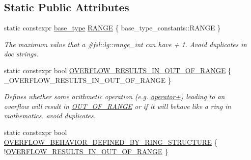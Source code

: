 \subsection*{Static Public Attributes}
\begin{DoxyCompactItemize}
\item 
static constexpr \mbox{\hyperlink{classfsl_1_1ver1__0_1_1lg_1_1range__int_af14c814b65a761cd387e7577eb2ef78c}{base\+\_\+type}} \mbox{\hyperlink{classfsl_1_1ver1__0_1_1lg_1_1range__int_a48e6f92039600251a43bd027a8a5aa10}{R\+A\+N\+GE}} \{ base\+\_\+type\+\_\+constants\+::\+R\+A\+N\+GE \}
\begin{DoxyCompactList}\small\item\em The maximum value that a \#fsl\+::lg\+::range\+\_\+int can have + 1. Avoid duplicates in doc strings. \end{DoxyCompactList}\item 
\mbox{\label{classfsl_1_1ver1__0_1_1lg_1_1range__int_a8a6dd23271d15da337fb8af2596a9ebe}} 
static constexpr bool \mbox{\hyperlink{classfsl_1_1ver1__0_1_1lg_1_1range__int_a8a6dd23271d15da337fb8af2596a9ebe}{O\+V\+E\+R\+F\+L\+O\+W\+\_\+\+R\+E\+S\+U\+L\+T\+S\+\_\+\+I\+N\+\_\+\+O\+U\+T\+\_\+\+O\+F\+\_\+\+R\+A\+N\+GE}} \{ \+\_\+\+O\+V\+E\+R\+F\+L\+O\+W\+\_\+\+R\+E\+S\+U\+L\+T\+S\+\_\+\+I\+N\+\_\+\+O\+U\+T\+\_\+\+O\+F\+\_\+\+R\+A\+N\+GE \}
\begin{DoxyCompactList}\small\item\em Defines whether some arithmetic operation (e.\+g. \mbox{\hyperlink{classfsl_1_1ver1__0_1_1lg_1_1range__int_aa2c1e9553dae1b9858d307b6faaee489}{operator+}}) leading to an overflow will result in \mbox{\hyperlink{classfsl_1_1ver1__0_1_1lg_1_1range__int_a690eec0614992c007017ea852bb58210}{O\+U\+T\+\_\+\+O\+F\+\_\+\+R\+A\+N\+GE}} or if it will behave like a ring in mathematics. avoid duplicates. \end{DoxyCompactList}\item 
\mbox{\label{classfsl_1_1ver1__0_1_1lg_1_1range__int_a4a768b904cfcfaba1340e891b6587e8a}} 
static constexpr bool \mbox{\hyperlink{classfsl_1_1ver1__0_1_1lg_1_1range__int_a4a768b904cfcfaba1340e891b6587e8a}{O\+V\+E\+R\+F\+L\+O\+W\+\_\+\+B\+E\+H\+A\+V\+I\+O\+R\+\_\+\+D\+E\+F\+I\+N\+E\+D\+\_\+\+B\+Y\+\_\+\+R\+I\+N\+G\+\_\+\+S\+T\+R\+U\+C\+T\+U\+RE}} \{ !\mbox{\hyperlink{classfsl_1_1ver1__0_1_1lg_1_1range__int_a8a6dd23271d15da337fb8af2596a9ebe}{O\+V\+E\+R\+F\+L\+O\+W\+\_\+\+R\+E\+S\+U\+L\+T\+S\+\_\+\+I\+N\+\_\+\+O\+U\+T\+\_\+\+O\+F\+\_\+\+R\+A\+N\+GE}} \}

\end{DoxyCompactItemize}

